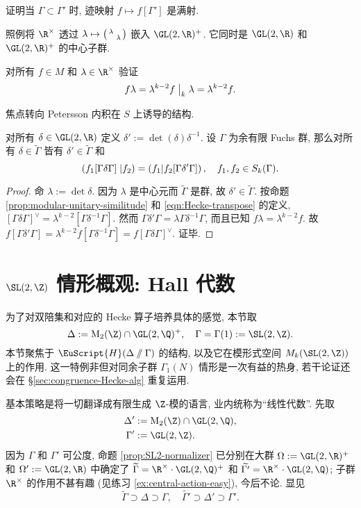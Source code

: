 \begin{exercise}
	证明当 $\Gamma \subset \Gamma'$ 时, 迹映射 $f \mapsto f[\Gamma']$ 是满射.
\end{exercise}

照例将 $\R^\times$ 透过 $\lambda \mapsto \bigl(\begin{smallmatrix} \lambda &  \\  & \lambda \end{smallmatrix}\bigr)$ 嵌入 $\GL(2,\R)^+$. 它同时是 $\GL(2,\R)$ 和 $\GL(2,\R)^+$ 的中心子群.

\begin{exercise}\label{ex:central-action-easy}
	对所有 $f \in M$ 和 $\lambda \in \R^\times$ 验证
	\[ f\lambda = \lambda^{k-2} f \;\big|_{k} \; \lambda = \lambda^{k-2} f. \]
\end{exercise}

焦点转向 Petersson 内积在 $S$ 上诱导的结构.
\begin{proposition}\label{prop:delta-prime}
	对所有 $\delta \in \GL(2, \R)$ 定义 $\delta' := \det(\delta) \delta^{-1}$. 设 $\Gamma$ 为余有限 Fuchs 群, 那么对所有 $\delta \in \widetilde{\Gamma}$ 皆有 $\delta' \in \widetilde{\Gamma}$ 和
	\[ \left( f_1 [\Gamma\delta\Gamma]\; \middle| f_2 \right) = \left( f_1 \middle| f_2 [\Gamma\delta'\Gamma] \right), \quad f_1, f_2 \in S_k(\Gamma). \]
\end{proposition}
\begin{proof}
	命 $\lambda := \det\delta$. 因为 $\lambda$ 是中心元而 $\widetilde{\Gamma}$ 是群, 故 $\delta' \in \widetilde{\Gamma}$. 按命题 \ref{prop:modular-unitary-similitude} 和 \eqref{eqn:Hecke-transpose} 的定义, $[\Gamma\delta\Gamma]^\vee = \lambda^{k-2}[\Gamma\delta^{-1}\Gamma]$. 然而 $\Gamma \delta' \Gamma = \lambda \Gamma\delta^{-1}\Gamma$, 而且已知 $f\lambda = \lambda^{k-2} f$. 故 $f[\Gamma\delta'\Gamma] = \lambda^{k-2} f[\Gamma\delta^{-1}\Gamma] = f[\Gamma\delta\Gamma]^\vee$. 证毕.
\end{proof}

\section{\texorpdfstring{$\SL(2,\Z)$}{SL2Z} 情形概观: Hall 代数}\label{sec:Hecke-full-level}
为了对双陪集和对应的 Hecke 算子培养具体的感觉, 本节取
\[ \Delta := \Mat_2(\Z) \cap \GL(2,\Q)^+, \quad \Gamma = \Gamma(1) := \SL(2,\Z). \]
本节聚焦于 $\EuScript{H}(\Delta \sslash \Gamma)$ 的结构, 以及它在模形式空间 $M_k(\SL(2,\Z))$ 上的作用. 这一特例非但对同余子群 $\Gamma_1(N)$ 情形是一次有益的热身, 若干论证还会在 \S\ref{sec:congruence-Hecke-alg} 重复运用.

基本策略是将一切翻译成有限生成 $\Z$-模的语言, 业内统称为``线性代数''. 先取
\begin{align*}
	\Delta' & := \Mat_2(\Z) \cap \GL(2,\Q), \\
	\Gamma' & := \GL(2,\Z).
\end{align*}
因为 $\Gamma$ 和 $\Gamma'$ 可公度, 命题 \ref{prop:SL2-normalizer} 已分别在大群 $\Omega := \GL(2,\R)^+$ 和 $\Omega' := \GL(2,\R)$ 中确定了 $\widetilde{\Gamma} = \R^\times \cdot \GL(2,\Q)^+$ 和 $\widetilde{\Gamma'} = \R^\times \cdot \GL(2,\Q)$; 子群 $\R^\times$ 的作用不甚有趣 (见练习 \ref{ex:central-action-easy}), 今后不论. 显见
\[ \widetilde{\Gamma} \supset \Delta \supset \Gamma ,\quad \widetilde{\Gamma'} \supset \Delta' \supset \Gamma'. \]

